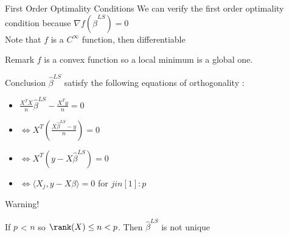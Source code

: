 \documentclass[unknownkeysallowed]{beamer}
\begin{document}
\begin{frame}
\begin{alertblock}{First Order Optimality Conditions}
We can verify the first order optimality condition because $\nabla{f(\hat\beta^{LS})}=0$
\\
Note that $f$ is a $C^{\infty}$ function, then differentiable

\end{alertblock}

\begin{block}{Remark}
\rem $f$ is a convex function so a local minimum is a global one.
\end{block}

\begin{block}{Conclusion}
$\hat\beta^{LS}$ satisfy the following equations of orthogonality :
\begin{itemize}
        \item $\frac{X^TX}{n}\hat\beta^{LS}-\frac{X^Ty}{n}=0$
        \item $\iff X^T(\frac{X\hat\beta^{LS}-y}{n})=0$
        \item $\iff X^T(y-X\hat\beta^{LS})=0$
        \item $\iff \langle X_{j},y-X\beta\rangle=0$ for $j in [1]:p$
    \end{itemize}


\end{block}

\newpage

\begin{block}{Warning!}

If $p$ < $n$ so $\rank(X) \leq n < p$. Then $\hat\beta^{LS}$ is not unique

\end{block}


\end{frame}
\end{document}
